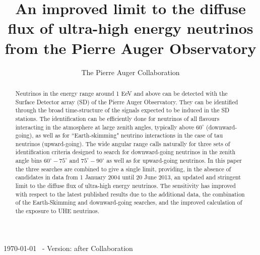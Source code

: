\documentclass[reprint,showpacs,showkeys,amsmath,amssymb,aps,nofootinbib]{revtex4-1}
\begin{document}
\title{An improved limit to the diffuse flux of ultra-high energy neutrinos \\ 
from the Pierre Auger Observatory}

\author{The Pierre Auger Collaboration}
%

\begin{center}
\today ~ - Version: after Collaboration 
\end{center}


\begin{abstract}
Neutrinos in the energy range around 1 EeV and above can be detected with the 
Surface Detector array (SD) of the Pierre Auger Observatory. They can be 
identified through the broad time-structure of the signals expected to be 
induced in the SD stations. The identification can be efficiently done for 
neutrinos of all flavours interacting in the atmosphere at large zenith angles, 
typically above $60^\circ$ (downward-going), as well as for ``Earth-skimming" 
neutrino interactions in the case of tau neutrinos (upward-going). The wide 
angular range calls naturally for three sets of identification criteria designed 
to search for downward-going neutrinos in the zenith angle bins 
$60^\circ-75^\circ$ and $75^\circ-90^\circ$ as well as for upward-going neutrinos. 
In this paper the three searches are combined to give a single limit, providing, 
in the absence of candidates in data from 1 January 2004 until 20 June 2013, 
an updated and stringent limit to the diffuse flux of ultra-high energy neutrinos.
The sensitivity has improved with respect to the latest published results 
due to the additional data, the combination of the Earth-Skimming and downward-going searches,
and the improved calculation of the exposure to UHE neutrinos. 
\end{abstract}



\maketitle
\end{document}
